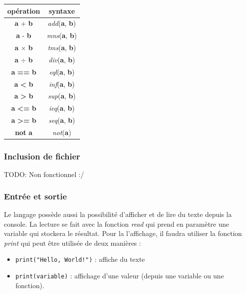 \documentclass[a4paper]{article}%
\begin{document}
\begin{center}
\begin{tabular}{ | c | c | }
    \hline
    opération & syntaxe\\
    \hline
    \textbf{a} + \textbf{b} & \textit{add}(\textbf{a}, \textbf{b})\\
    \hline
    \textbf{a} - \textbf{b} & \textit{mns}(\textbf{a}, \textbf{b})\\
    \hline
    \textbf{a} $\times$ \textbf{b} & \textit{tms}(\textbf{a}, \textbf{b})\\
    \hline
    \textbf{a} $\div$ \textbf{b} & \textit{div}(\textbf{a}, \textbf{b})\\
    \hline
    \textbf{a} \textbf{==} \textbf{b} & \textit{eql}(\textbf{a}, \textbf{b})\\
    \hline
    \textbf{a} \textbf{<} \textbf{b} & \textit{inf}(\textbf{a}, \textbf{b})\\
    \hline
    \textbf{a} \textbf{>} \textbf{b} & \textit{sup}(\textbf{a}, \textbf{b})\\
    \hline
    \textbf{a} \textbf{<=} \textbf{b} & \textit{ieq}(\textbf{a}, \textbf{b})\\
    \hline
    \textbf{a} \textbf{>=} \textbf{b} & \textit{seq}(\textbf{a}, \textbf{b})\\
    \hline
    \textbf{not} \textbf{a} & \textit{not}(\textbf{a})\\
    \hline
\end{tabular}
\end{center}

\subsubsection{Inclusion de fichier}

TODO: Non fonctionnel :/

\subsubsection{Entrée et sortie}

Le langage possède aussi la possibilité d'afficher et de lire du texte depuis la
console. La lecture se fait avec la fonction \textit{read} qui prend en
paramètre une variable qui stockera le résultat. Pour la l'affichage, il faudra
utiliser la fonction \textit{print} qui peut être utilisée de deux manières :

\begin{itemize}
  \item \lstinline{print("Hello, World!")} : affiche du texte
  \item \lstinline{print(variable)} : affichage d'une valeur (depuis une
    variable ou une fonction).
\end{itemize}
\end{document}
